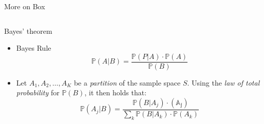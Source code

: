 \documentclass[pdf]{beamer}
\begin{document}
\begin{frame}{More on Box}

\begin{columns}[t]
    
    \begin{column}{0.5\linewidth}
    
        
        
    \end{column}
    
    \begin{column}{0.33\linewidth}
    
        
    \end{column}

\end{columns}

    
\end{frame}


\begin{frame}{Bayes' theorem}
    \begin{Theorem} %
     \begin{itemize}
        \item Bayes Rule\\
        \[\mathds{P}(A|B) = \frac{\mathds{P}(P|A) \cdot \mathds{P}(A)}{\mathds{P}(B)}\]
        \item Let \(A_1, A_2, \dots , A_K\) be a \textit{partition} of the sample space \(S\). Using the \textit{law of total probability} for \(\mathds{P}(B)\), it then holds that:
        \[
            \mathds{P}(A_j | B) = \frac{\mathds{P}(B|A_j) \cdot \mathds{(A_j)}}{\sum_k \mathds{P}(B|A_k) \cdot \mathds{P}(A_k)}
        \]
    \end{itemize}
    \end{Theorem}
\end{frame}
\end{document}
